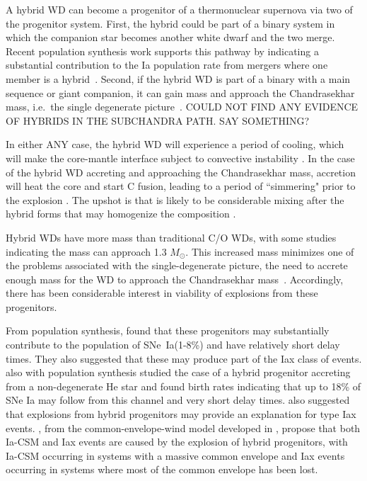 \documentclass[iop,apj]{emulateapj}
\newcommand{\SNeIa}{SNe~Ia}
\newcommand{\Msun}{\ensuremath{M_\odot}}
\begin{document}
A hybrid WD can become a progenitor of a thermonuclear supernova via two 
of the progenitor system. 
First, the hybrid could be part of a binary system in which the companion star becomes
another white dwarf and the two merge. Recent population synthesis work supports
this pathway by indicating a substantial contribution to the Ia population rate from 
mergers where one member is a hybrid~\citep{yungelsonkuranov2017}. Second, if the hybrid 
WD is part of a binary with a main sequence or giant companion, it can gain mass and 
approach the Chandrasekhar mass, i.e.\  the single degenerate picture~\citep{willcoxetal2016}. 
{\color{red} COULD NOT FIND ANY EVIDENCE OF HYBRIDS IN THE SUBCHANDRA PATH. SAY 
SOMETHING?}

In either {\color{red}ANY} case, the hybrid WD will experience a period of cooling, which will
make the core-mantle interface subject to convective 
instability \citep{brooksetal2017,schwabgaraud2018}. In the case of the 
hybrid WD accreting and approaching the Chandrasekhar mass, accretion will
heat the core and start C fusion, leading to a period of ``simmering" prior
to the explosion \citep{PiroBild08}. The upshot is that is likely to be considerable
mixing after the hybrid forms that may homogenize the composition 
\citep{denissenkovetal2015,brooksetal2017,schwabgaraud2018}.

Hybrid WDs have more mass than traditional C/O WDs, with some studies indicating the
mass can approach 1.3 \Msun \citep{chenetal2014}. This increased mass
minimizes one of the problems associated with the single-degenerate picture,
the need to accrete enough mass for the WD to approach the Chandrasekhar
mass~\citep{chenetal2014,denissenkovetal2015,kromeretal2015}.
Accordingly, there has been considerable interest in viability of explosions from 
these progenitors. 

From population synthesis, \citet{mengpods2014} found that these
progenitors may substantially contribute to the population of \SNeIa (1-8\%) and have
relatively short delay times. They also suggested that these 
may produce part of the Iax class of events. \citet{Wangetal2014} also with population
synthesis studied the case
of a hybrid progenitor accreting from a non-degenerate He star and found
birth rates indicating that up to 18\% of SNe Ia may follow from this channel
and very short delay times. \citet{Wangetal2014} also suggested that explosions 
from hybrid progenitors may provide an explanation for type Iax events.
\citet{mengpods2018}, from the common-envelope-wind model developed in 
\citep{mengpods2014}, propose that both Ia-CSM and Iax events 
are caused by the explosion of hybrid progenitors, with Ia-CSM occurring in systems with 
a massive common envelope and Iax events occurring in systems where most of the common envelope
has been lost.
\end{document}
